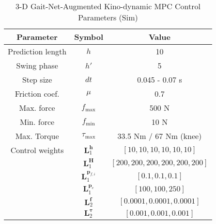 \begin{table}[H]
	\vspace{0.2cm}
	\centering
	\caption{3-D Gait-Net-Augmented Kino-dynamic MPC Control Parameters (Sim)}
	\begin{tabular}{ccc}
	\hline
	Parameter & Symbol & Value \\
	\hline
	Prediction length & $h$  &  10 \\
        Swing phase & $h'$ & 5 \\
        Step size & $dt$  &  0.045 - 0.07 s \\
        Friction coef. & $\mu$  &  0.7 \\
        Max. force & $f_\text{max}$  &  500 N \\
        Min. force & $f_\text{min}$  &  10 N \\
        Max. Torque & $\tau_\text{max}$ & 33.5 Nm / 67 Nm (knee)\\
        Control weights & $\bm L_1^{\bm h}$  &  $[10, 10, 10, 10, 10, 10]$ \\
        & $\bm L_1^{\bm H}$  &  $[200, 200, 200, 200, 200, 200]$ \\
        & $\bm L_1^{\bm p_{f,i}}$ & $[0.1, 0.1, 0.1]$ \\
        & $\bm L_1^{\bm p_{c}}$ & $[100, 100, 250]$ \\
        & $\bm L_2^{\bm f}$ & $[0.0001, 0.0001, 0.0001]$ \\
        & $\bm L_2^{\bm \tau}$ & $[0.001, 0.001, 0.001]$ \\
	\hline 
	\end{tabular}
	\vspace{0.2cm}
\end{table}	

